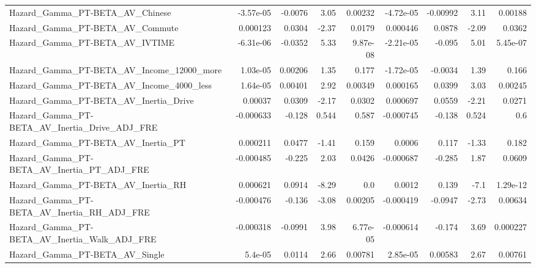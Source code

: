 \begin{tabular}{lrrrrrrrr}
Hazard\_Gamma\_PT-BETA\_AV\_Chinese                    &   -3.57e-05 &      -0.0076 &     3.05 &  0.00232 &  -4.72e-05 &    -0.00992 &         3.11 &       0.00188 \\
Hazard\_Gamma\_PT-BETA\_AV\_Commute                    &    0.000123 &       0.0304 &    -2.37 &   0.0179 &   0.000446 &      0.0878 &        -2.09 &        0.0362 \\
Hazard\_Gamma\_PT-BETA\_AV\_IVTIME                     &   -6.31e-06 &      -0.0352 &     5.33 & 9.87e-08 &  -2.21e-05 &      -0.095 &         5.01 &      5.45e-07 \\
Hazard\_Gamma\_PT-BETA\_AV\_Income\_12000\_more          &    1.03e-05 &      0.00206 &     1.35 &    0.177 &  -1.72e-05 &     -0.0034 &         1.39 &         0.166 \\
Hazard\_Gamma\_PT-BETA\_AV\_Income\_4000\_less           &    1.64e-05 &      0.00401 &     2.92 &  0.00349 &   0.000165 &      0.0399 &         3.03 &       0.00245 \\
Hazard\_Gamma\_PT-BETA\_AV\_Inertia\_Drive              &     0.00037 &       0.0309 &    -2.17 &   0.0302 &   0.000697 &      0.0559 &        -2.21 &        0.0271 \\
Hazard\_Gamma\_PT-BETA\_AV\_Inertia\_Drive\_ADJ\_FRE      &   -0.000633 &       -0.128 &    0.544 &    0.587 &  -0.000745 &      -0.138 &        0.524 &           0.6 \\
Hazard\_Gamma\_PT-BETA\_AV\_Inertia\_PT                 &    0.000211 &       0.0477 &    -1.41 &    0.159 &     0.0006 &       0.117 &        -1.33 &         0.182 \\
Hazard\_Gamma\_PT-BETA\_AV\_Inertia\_PT\_ADJ\_FRE         &   -0.000485 &       -0.225 &     2.03 &   0.0426 &  -0.000687 &      -0.285 &         1.87 &        0.0609 \\
Hazard\_Gamma\_PT-BETA\_AV\_Inertia\_RH                 &    0.000621 &       0.0914 &    -8.29 &      0.0 &     0.0012 &       0.139 &         -7.1 &      1.29e-12 \\
Hazard\_Gamma\_PT-BETA\_AV\_Inertia\_RH\_ADJ\_FRE         &   -0.000476 &       -0.136 &    -3.08 &  0.00205 &  -0.000419 &     -0.0947 &        -2.73 &       0.00634 \\
Hazard\_Gamma\_PT-BETA\_AV\_Inertia\_Walk\_ADJ\_FRE       &   -0.000318 &      -0.0991 &     3.98 & 6.77e-05 &  -0.000614 &      -0.174 &         3.69 &      0.000227 \\
Hazard\_Gamma\_PT-BETA\_AV\_Single                     &     5.4e-05 &       0.0114 &     2.66 &  0.00781 &   2.85e-05 &     0.00583 &         2.67 &       0.00761 \\

\end{tabular}
